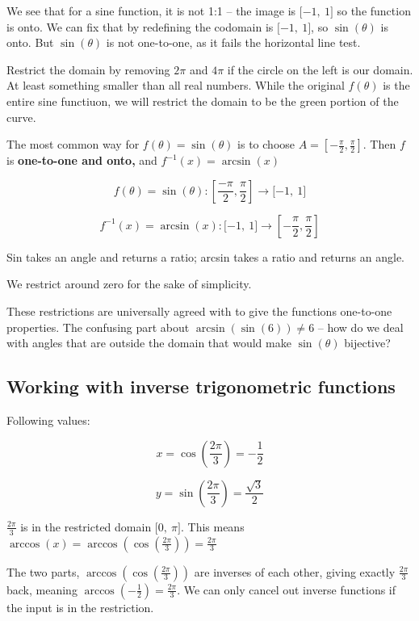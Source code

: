 \documentclass[12pt]{article}
\theoremstyle{plain}
\theoremstyle{remark}
\theoremstyle{definition}
\begin{document}
We see that for a sine function, it is not 1:1 -- the image is
\(\lbrack - 1,\ 1\rbrack\) so the function is onto. We can fix that by
redefining the codomain is \(\lbrack - 1,\ 1\rbrack\), so
\(\sin(\theta)\) is onto. But \(\sin(\theta)\) is not one-to-one, as it
fails the horizontal line test.

Restrict the domain by removing \(2\pi\) and \(4\pi\) if the circle on
the left is our domain. At least something smaller than all real
numbers. While the original \(f(\theta)\) is the entire sine functiuon,
we will restrict the domain to be the green portion of the curve.

The most common way for \(f(\theta) = \sin(\theta)\) is to choose
\(A = \left\lbrack - \frac{\pi}{2},\frac{\pi}{2} \right\rbrack\). Then
\(f\) is \textbf{one-to-one and onto,} and \(f^{- 1}(x) = \arcsin(x)\)

\[f(\theta) = \sin(\theta):\left\lbrack \frac{-\pi}{2},\frac{\pi}{2} \right\rbrack \rightarrow \lbrack - 1,\ 1\rbrack\]

\[f^{- 1}(x) = \arcsin(x):\lbrack - 1,\ 1\rbrack \rightarrow \left\lbrack - \frac{\pi}{2},\frac{\pi}{2} \right\rbrack\]

Sin takes an angle and returns a ratio; arcsin takes a ratio and returns
an angle.

We restrict around zero for the sake of simplicity.

These restrictions are universally agreed with to give the functions
one-to-one properties. The confusing part about
\(\arcsin\left( \sin(6) \right) \neq 6\) -- how do we deal with angles
that are outside the domain that would make \(\sin(\theta)\) bijective?


\subsection{Working with inverse trigonometric
functions}

Following values:

\[x = \cos\left( \frac{2\pi}{3} \right) = - \frac{1}{2}\]

\[y = \sin\left( \frac{2\pi}{3} \right) = \frac{\sqrt{3}}{2}\]

\(\frac{2\pi}{3}\) is in the restricted domain
\(\lbrack 0,\ \pi\rbrack\). This means
\(\arccos(x) = \arccos\left( \cos\left( \frac{2\pi}{3} \right) \right) = \frac{2\pi}{3}\)

The two parts,
\(\arccos\left( \cos\left( \frac{2\pi}{3} \right) \right)\) are inverses
of each other, giving exactly \(\frac{2\pi}{3}\) back, meaning
\(\arccos\left( - \frac{1}{2} \right) = \frac{2\pi}{3}\). We can only
cancel out inverse functions if the input is in the restriction.
\end{document}
